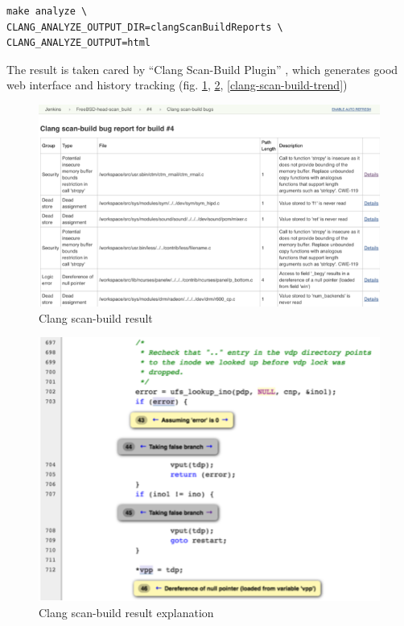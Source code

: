 \documentclass[a4paper,twocolumn,10pt]{article}
\begin{document}
\begin{lstlisting}[caption=Command to perform clang scan-build,label=make-analyze]
make analyze \
CLANG_ANALYZE_OUTPUT_DIR=clangScanBuildReports \
CLANG_ANALYZE_OUTPUT=html
\end{lstlisting}

The result is taken cared by ``Clang Scan-Build Plugin''
\cite{jenkins-clang-scan-build-plugin}, which generates good web interface and
history tracking (fig.  \ref{scan-build-result}, \ref{scan-build-path},
\ref{clang-scan-build-trend})

\begin{figure}
\includegraphics[width=\textwidth]{scan-build-result.png}
\caption{Clang scan-build result}
\label{scan-build-result}
\end{figure}

\begin{figure}
\includegraphics[width=\textwidth]{scan-build-path.png}
\caption{Clang scan-build result explanation}
\label{scan-build-path}
\end{figure}
\end{document}
